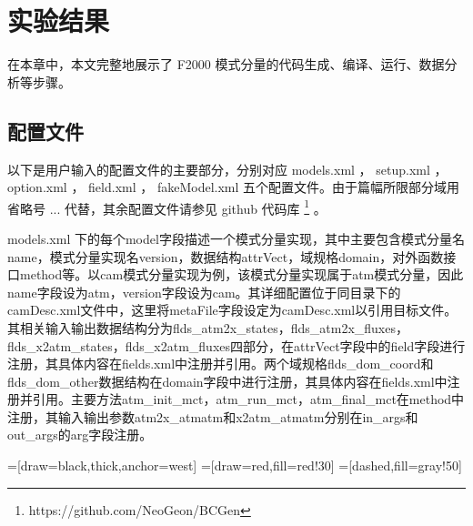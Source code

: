 
\chapter{实验结果}
\label{cha:experiment}

在本章中，本文完整地展示了 F2000 模式分量的代码生成、编译、运行、数据分析等步骤。

\section{配置文件}

以下是用户输入的配置文件的主要部分，分别对应 models.xml ， setup.xml ， option.xml ， field.xml ，  fakeModel.xml 五个配置文件。由于篇幅所限部分域用省略号 ... 代替，其余配置文件请参见 github 代码库 \footnote{https://github.com/NeoGeon/BCGen} 。

models.xml 下的每个model字段描述一个模式分量实现，其中主要包含模式分量名name，模式分量实现名version，数据结构attrVect，域规格domain，对外函数接口method等。以cam模式分量实现为例，该模式分量实现属于atm模式分量，因此name字段设为atm，version字段设为cam。其详细配置位于同目录下的camDesc.xml文件中，这里将metaFile字段设定为camDesc.xml以引用目标文件。其相关输入输出数据结构分为flds\_atm2x\_states，flds\_atm2x\_fluxes，flds\_x2atm\_states，flds\_x2atm\_fluxes四部分，在attrVect字段中的field字段进行注册，其具体内容在fields.xml中注册并引用。两个域规格flds\_dom\_coord和flds\_dom\_other数据结构在domain字段中进行注册，其具体内容在fields.xml中注册并引用。主要方法atm\_init\_mct，atm\_run\_mct，atm\_final\_mct在method中注册，其输入输出参数atm2x\_atmatm和x2atm\_atmatm分别在in\_args和out\_args的arg字段注册。

\usetikzlibrary{trees}
=[draw=black,thick,anchor=west]
=[draw=red,fill=red!30]
=[dashed,fill=gray!50]

